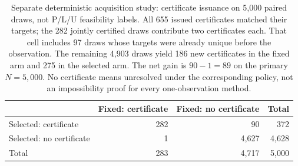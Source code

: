 \begin{table}[t]
\centering
\small
\begin{tabular}{lrrr}
\toprule
 & Fixed: certificate & Fixed: no certificate & Total\\
\midrule
Selected: certificate & 282 & 90 & 372\\
Selected: no certificate & 1 & 4,627 & 4,628\\
\midrule
Total & 283 & 4,717 & 5,000\\
\bottomrule
\end{tabular}
\caption{Separate deterministic acquisition study: certificate issuance
on 5,000 paired draws, not P/L/U feasibility labels. All 655 issued
certificates matched their targets; the 282 jointly certified draws
contribute two certificates each. That cell includes 97 draws whose
targets were already unique before the observation. The remaining
4,903 draws yield 186 new certificates in the fixed arm and 275 in
the selected arm. The net gain is $90-1=89$ on the primary $N=5{,}000$.
No certificate means unresolved under the corresponding policy, not an
impossibility proof for every one-observation method.}
\label{tab:observation-selection}
\end{table}
